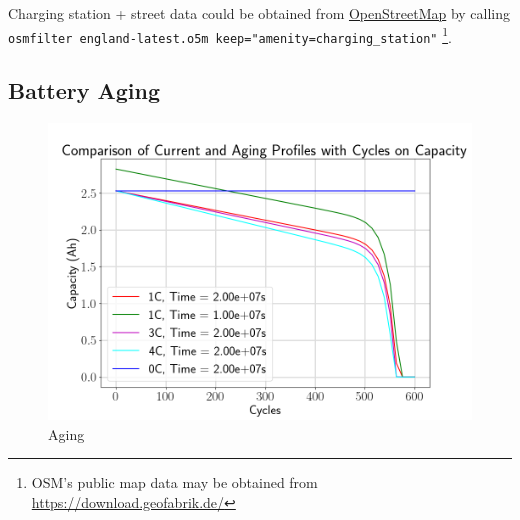 \documentclass{prettytex/ox/mmsc-special-topic}
\begin{document}
  Charging station + street data could be obtained from \href{https://osm.org/}{OpenStreetMap} by calling \\
  \texttt{osmfilter england-latest.o5m \-\-keep="amenity=charging\_station"} \footnote{OSM's public map data may be obtained from \url{https://download.geofabrik.de/}}.



  \subsection{Battery Aging}
  \begin{figure}[H]
    \centering
    \includegraphics[width=0.7\linewidth]{figures/aging.png}
    \caption{Aging}
    \label{fig:aging}
  \end{figure}
\end{document}
